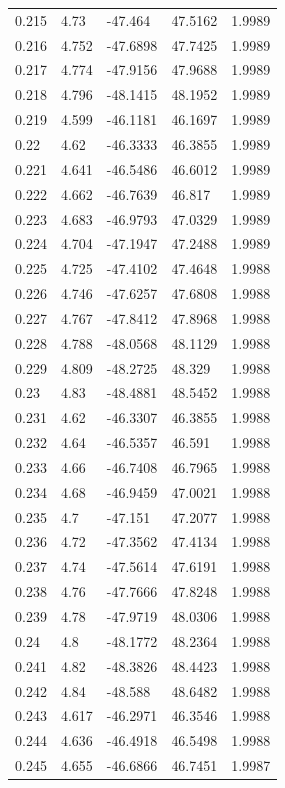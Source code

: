 \begin{tabular}{lllll}
0.215 & 4.73 & -47.464 & 47.5162 & 1.9989 \\
0.216 & 4.752 & -47.6898 & 47.7425 & 1.9989 \\
0.217 & 4.774 & -47.9156 & 47.9688 & 1.9989 \\
0.218 & 4.796 & -48.1415 & 48.1952 & 1.9989 \\
0.219 & 4.599 & -46.1181 & 46.1697 & 1.9989 \\
0.22 & 4.62 & -46.3333 & 46.3855 & 1.9989 \\
0.221 & 4.641 & -46.5486 & 46.6012 & 1.9989 \\
0.222 & 4.662 & -46.7639 & 46.817 & 1.9989 \\
0.223 & 4.683 & -46.9793 & 47.0329 & 1.9989 \\
0.224 & 4.704 & -47.1947 & 47.2488 & 1.9989 \\
0.225 & 4.725 & -47.4102 & 47.4648 & 1.9988 \\
0.226 & 4.746 & -47.6257 & 47.6808 & 1.9988 \\
0.227 & 4.767 & -47.8412 & 47.8968 & 1.9988 \\
0.228 & 4.788 & -48.0568 & 48.1129 & 1.9988 \\
0.229 & 4.809 & -48.2725 & 48.329 & 1.9988 \\
0.23 & 4.83 & -48.4881 & 48.5452 & 1.9988 \\
0.231 & 4.62 & -46.3307 & 46.3855 & 1.9988 \\
0.232 & 4.64 & -46.5357 & 46.591 & 1.9988 \\
0.233 & 4.66 & -46.7408 & 46.7965 & 1.9988 \\
0.234 & 4.68 & -46.9459 & 47.0021 & 1.9988 \\
0.235 & 4.7 & -47.151 & 47.2077 & 1.9988 \\
0.236 & 4.72 & -47.3562 & 47.4134 & 1.9988 \\
0.237 & 4.74 & -47.5614 & 47.6191 & 1.9988 \\
0.238 & 4.76 & -47.7666 & 47.8248 & 1.9988 \\
0.239 & 4.78 & -47.9719 & 48.0306 & 1.9988 \\
0.24 & 4.8 & -48.1772 & 48.2364 & 1.9988 \\
0.241 & 4.82 & -48.3826 & 48.4423 & 1.9988 \\
0.242 & 4.84 & -48.588 & 48.6482 & 1.9988 \\
0.243 & 4.617 & -46.2971 & 46.3546 & 1.9988 \\
0.244 & 4.636 & -46.4918 & 46.5498 & 1.9988 \\
0.245 & 4.655 & -46.6866 & 46.7451 & 1.9987 \\

\end{tabular}
